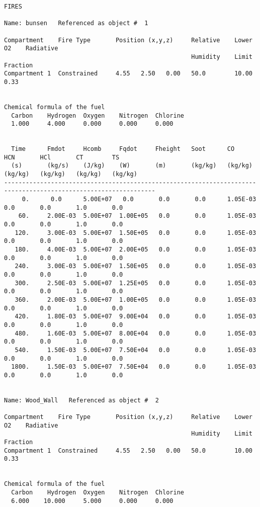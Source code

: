 \begin{lstlisting}[basicstyle=\tiny]
FIRES

Name: bunsen   Referenced as object #  1

Compartment    Fire Type       Position (x,y,z)     Relative    Lower O2    Radiative
                                                    Humidity    Limit       Fraction
Compartment 1  Constrained     4.55   2.50   0.00   50.0        10.00        0.33


Chemical formula of the fuel
  Carbon    Hydrogen  Oxygen    Nitrogen  Chlorine
  1.000     4.000     0.000     0.000     0.000


  Time      Fmdot     Hcomb     Fqdot     Fheight   Soot      CO        HCN       HCl       CT        TS
  (s)       (kg/s)    (J/kg)    (W)       (m)       (kg/kg)   (kg/kg)   (kg/kg)   (kg/kg)   (kg/kg)   (kg/kg)
----------------------------------------------------------------------------------------------------------------
     0.      0.0      5.00E+07   0.0       0.0       0.0      1.05E-03   0.0       0.0       1.0       0.0
    60.     2.00E-03  5.00E+07  1.00E+05   0.0       0.0      1.05E-03   0.0       0.0       1.0       0.0
   120.     3.00E-03  5.00E+07  1.50E+05   0.0       0.0      1.05E-03   0.0       0.0       1.0       0.0
   180.     4.00E-03  5.00E+07  2.00E+05   0.0       0.0      1.05E-03   0.0       0.0       1.0       0.0
   240.     3.00E-03  5.00E+07  1.50E+05   0.0       0.0      1.05E-03   0.0       0.0       1.0       0.0
   300.     2.50E-03  5.00E+07  1.25E+05   0.0       0.0      1.05E-03   0.0       0.0       1.0       0.0
   360.     2.00E-03  5.00E+07  1.00E+05   0.0       0.0      1.05E-03   0.0       0.0       1.0       0.0
   420.     1.80E-03  5.00E+07  9.00E+04   0.0       0.0      1.05E-03   0.0       0.0       1.0       0.0
   480.     1.60E-03  5.00E+07  8.00E+04   0.0       0.0      1.05E-03   0.0       0.0       1.0       0.0
   540.     1.50E-03  5.00E+07  7.50E+04   0.0       0.0      1.05E-03   0.0       0.0       1.0       0.0
  1800.     1.50E-03  5.00E+07  7.50E+04   0.0       0.0      1.05E-03   0.0       0.0       1.0       0.0


Name: Wood_Wall   Referenced as object #  2

Compartment    Fire Type       Position (x,y,z)     Relative    Lower O2    Radiative
                                                    Humidity    Limit       Fraction
Compartment 1  Constrained     4.55   2.50   0.00   50.0        10.00        0.33


Chemical formula of the fuel
  Carbon    Hydrogen  Oxygen    Nitrogen  Chlorine
  6.000    10.000     5.000     0.000     0.000



\end{lstlisting}
